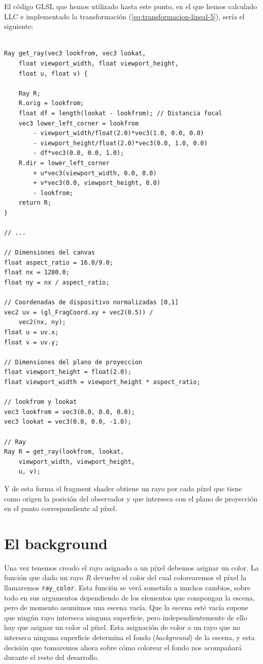 El código GLSL que hemos utilizado hasta este punto, en el que hemos calculado $\mathrm{LLC}$ e implementado la transformación (\ref{eq:transformacion-lineal-5}), sería el siguiente:

\begin{lstlisting}

Ray get_ray(vec3 lookfrom, vec3 lookat, 
    float viewport_width, float viewport_height, 
    float u, float v) {
    
    Ray R;
    R.orig = lookfrom;
    float df = length(lookat - lookfrom); // Distancia focal
    vec3 lower_left_corner = lookfrom
        - viewport_width/float(2.0)*vec3(1.0, 0.0, 0.0)
        - viewport_height/float(2.0)*vec3(0.0, 1.0, 0.0) 
        - df*vec3(0.0, 0.0, 1.0);
    R.dir = lower_left_corner 
        + u*vec3(viewport_width, 0.0, 0.0)
        + v*vec3(0.0, viewport_height, 0.0) 
        - lookfrom;
    return R;
}

// ... 

// Dimensiones del canvas
float aspect_ratio = 16.0/9.0;
float nx = 1280.0;
float ny = nx / aspect_ratio;

// Coordenadas de dispositivo normalizadas [0,1]
vec2 uv = (gl_FragCoord.xy + vec2(0.5)) / 
    vec2(nx, ny);
float u = uv.x;
float v = uv.y;

// Dimensiones del plano de proyeccion
float viewport_height = float(2.0);
float viewport_width = viewport_height * aspect_ratio;

// lookfrom y lookat
vec3 lookfrom = vec3(0.0, 0.0, 0.0);
vec3 lookat = vec3(0.0, 0.0, -1.0);

// Ray
Ray R = get_ray(lookfrom, lookat, 
    viewport_width, viewport_height, 
    u, v);
\end{lstlisting}

Y de esta forma el fragment shader obtiene un rayo por cada píxel que tiene como origen la posición del observador y que interseca con el plano de proyección en el punto correspondiente al píxel.

\section{El background}

Una vez tenemos creado el rayo asignado a un píxel debemos asignar un color. La función que dado un rayo $R$ devuelve el color del cual colorearemos el píxel la llamaremos \verb|ray_color|. Esta función se verá sometida a muchos cambios, sobre todo en sus argumentos dependiendo de los elementos que compongan la escena, pero de momento asumimos una escena vacía. Que la escena esté vacía supone que ningún rayo interseca ninguna superficie, pero independientemente de ello hay que asignar un color al píxel. Esta asignación de color a un rayo que no interseca ninguna superficie determina el fondo (\textit{background}) de la escena, y esta decisión que tomaremos ahora sobre cómo colorear el fondo nos acompañará durante el resto del desarrollo. 

